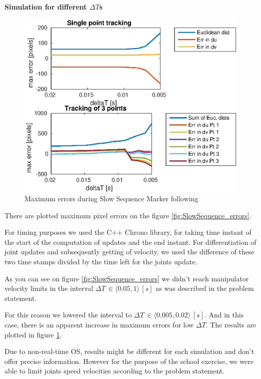\documentclass[]{scrartcl}
\begin{document}
\vspace{0.5cm}
\textbf{Simulation for different $\Delta T$s} \\
\begin{figure}
	\centering
	\includegraphics[width=0.7\linewidth]{fig/SlowSequence_low_dTs_errors.eps}
	\caption{Maximum errors during Slow Sequence Marker following}
	\label{fig:SlowSequence_low_dTs_errors}
\end{figure}

There are plotted maximum pixel errors on the figure \ref{fig:SlowSequence_errors}.

For timing purposes we used the C++ Chrono library, for taking time instant of the start of the computation of updates and the end instant. For differentiation of joint updates and subsequently getting of velocity, we used the difference of these two time stamps divided by the time left for the joints update. 

As you can see on figure \ref{fig:SlowSequence_errors} we didn't reach manipulator velocity limits in the interval $\Delta T \, \in \langle0.05, 1\rangle \, [s]$ as was described in the problem statement.

For this reason we lowered the interval to $\Delta T \, \in \langle0.005, 0.02\rangle \, [s]$. And in this case, there is an apparent increase in maximum errors for low $\Delta T$. The results are plotted in figure \ref{fig:SlowSequence_low_dTs_errors}.

Due to non-real-time OS, results might be different for each simulation and don't offer precise information. However for the purpose of the school exercise, we were able to limit joints speed velocities according to the problem statement.
\end{document}
